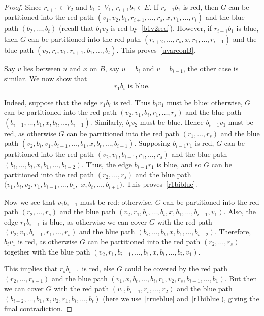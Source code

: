 \documentclass[a4paper,10pt]{article}
\begin{document}
\begin{proof}
Since $r_{i+1} \in V_2$ and $b_1 \in V_1$, $r_{i+1}b_1 \in E$.
If $r_{i+1}b_1$ is red, then $G$ can be partitioned into the red path $(v_1,v_2,b_1,r_{i+1},\ldots,r_s,x,r_1,\ldots,r_i)$ and the blue path $(b_2,\ldots,b_t)$ (recall that $b_1v_2$ is red by~\eqref{b1v2red}).
However, if $r_{i+1}b_1$ is blue, then $G$ can be partitioned into the red path $(r_{i+2},\ldots,r_s,x,r_1,\ldots,r_{i-1})$ and the blue path $(v_2,r_i,v_1,r_{i+1},b_1,\ldots,b_t)$.
This proves~\eqref{uvareonB}.

Say $v$ lies between $u$ and $x$ on $B$, say $u=b_i$ and $v=b_{i-1}$, the other case is similar. We now show that 
\begin{equation}\label{r1biblue}
\text{$r_1b_i$ is blue.}
\end{equation}

Indeed, suppose that the edge $r_1b_i$ is red.
Thus $b_iv_1$ must be blue: otherwise, $G$ can be partitioned into the red path $(v_2,v_1,b_i,r_1,\ldots,r_s)$ and the blue path $(b_{i-1},\ldots,b_1,x,b_t,\ldots,b_{i+1})$. Similarly, $b_iv_2$ must be blue.
Hence $b_{i-1}v_1$ must be red, as otherwise $G$ can be partitioned into the red path $(r_1,\ldots,r_s)$ and the blue path $(v_2,b_i,v_1,b_{i-1},\ldots,b_1,x,b_t,\ldots,b_{i+1})$.
Supposing $b_{i-1}r_1$ is red, $G$ can be partitioned into the red path $(v_2,v_1,b_{i-1},r_1,\ldots,r_s)$ and the blue path $(b_i,\ldots,b_t,x,b_1,\ldots,b_{i-2})$.
Thus, the edge $b_{i-1}r_1$ is blue, and so $G$ can be partitioned into the red path $(r_2,\ldots,r_s)$ and the blue path $(v_1,b_i,v_2,r_1,b_{i-1},\ldots,b_1,$ $x,b_t,\ldots,b_{i+1})$.
This proves~\eqref{r1biblue}.

Now we see that $v_1b_{i-1}$ must be red:
otherwise, $G$ can be partitioned into the red path $(r_2,\ldots,r_s)$ and the blue path $(v_2,r_1,b_i,\ldots,b_t,x,b_1,\ldots,b_{i-1},v_1)$.
Also, the edge $r_1b_{i-1}$ is blue, as otherwise we can cover $G$ with the red path $(v_2,v_1,b_{i-1},r_1,\ldots,r_s)$ and the blue path $(b_i,\ldots,b_t,x,b_1,\ldots,b_{i-2})$. 
Therefore, $b_iv_1$ is red, as otherwise $G$ can be partitioned into the red path $(r_2,\ldots,r_s)$ together with the blue path $(v_2,r_1,b_{i-1},\ldots,b_1,x,b_t,\ldots,b_i,v_1)$.

This implies that $r_sb_{i-1}$ is red, else $G$ could be covered by the red path $(r_2,\ldots,r_{s-1})$ and the blue path $(v_1,x,b_t,\ldots,b_i,r_1,v_2,r_s,b_{i-1},\ldots,b_1)$. But then we can cover $G$ with the red path $(v_1, b_{i-1}, r_s,\ldots, r_2)$ and the blue path $(b_{i-2},\ldots, b_1, x, v_2, r_1, b_i,\ldots, b_t)$ (here we use~\eqref{trueblue} and~\eqref{r1biblue}), giving the final contradiction.
\end{proof}
\end{document}
